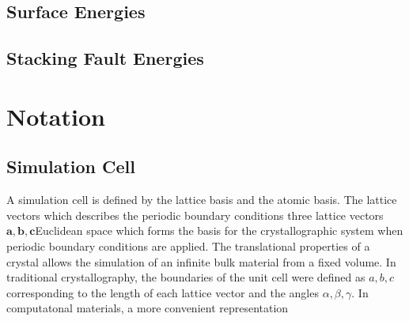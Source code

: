 \subsection{Surface Energies}
\subsection{Stacking Fault Energies}

\section{Notation}
\subsection{Simulation Cell}
A simulation cell is defined by the lattice basis and the atomic basis.  The lattice vectors which describes the periodic boundary conditions three lattice vectors $\bm{a},\bm{b},\bm{c}$Euclidean space which forms the basis for the crystallographic system when periodic boundary conditions are applied.  The translational properties of a crystal allows the simulation of an infinite bulk material from a fixed volume.  In traditional crystallography, the boundaries of the unit cell were defined as $a,b,c$ corresponding to the length of each lattice vector and the angles $\alpha,\beta,\gamma$.  In computatonal materials, a more convenient representation
